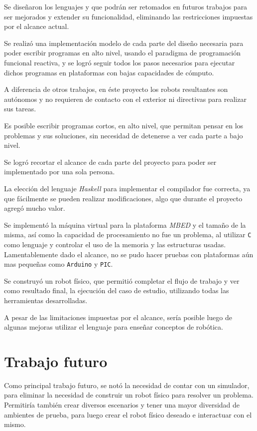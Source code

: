 
  Se diseñaron los lenguajes \frob{} y \alf{} que podrán ser
retomados en futuros trabajos para ser mejorados y extender
su funcionalidad, eliminando las restricciones impuestas
por el alcance actual.

  Se realizó una implementación modelo de cada parte del diseño
necesaria para poder escribir programas en alto nivel, usando
el paradigma de programación funcional reactiva, y se logró
seguir todos los pasos necesarios para ejecutar dichos programas
en plataformas con bajas capacidades de cómputo.

  A diferencia de otros trabajos, en éste proyecto los robots
resultantes son autónomos y no requieren de contacto con el
exterior ni directivas para realizar sus tareas.

  Es posible escribir programas cortos, en alto nivel, que permitan
pensar en los problemas y sus soluciones, sin necesidad de detenerse
a ver cada parte a bajo nivel.

  Se logró recortar el alcance de cada parte del proyecto para
poder ser implementado por una sola persona.

  La elección del lenguaje \textit{Haskell} para implementar el
compilador fue correcta, ya que fácilmente se pueden realizar
modificaciones, algo que durante el proyecto agregó mucho valor.

  Se implementó la máquina virtual para la plataforma \textit{MBED}
y el tamaño de la misma, así como la capacidad de procesamiento no
fue un problema, al utilizar \texttt{C} como lenguaje y controlar
el uso de la memoria y las estructuras usadas.
  Lamentablemente dado el alcance, no se pudo hacer pruebas
con plataformas aún mas pequeñas como \texttt{Arduino} y \texttt{PIC}.

  Se construyó un robot físico, que permitió completar el flujo
de trabajo y ver como resultado final, la ejecución del caso de
estudio, utilizando todas las herramientas desarrolladas.

  A pesar de las limitaciones impuestas por el alcance, sería
posible luego de algunas mejoras utilizar el lenguaje para enseñar
conceptos de robótica.

\section{Trabajo futuro}

  Como principal trabajo futuro, se notó la necesidad de contar con
un simulador, para eliminar la necesidad de construir un robot físico
para resolver un problema. Permitiría también crear diversos escenarios
y tener una mayor diversidad de ambientes de prueba, para luego
crear el robot físico deseado e interactuar con el mismo.

